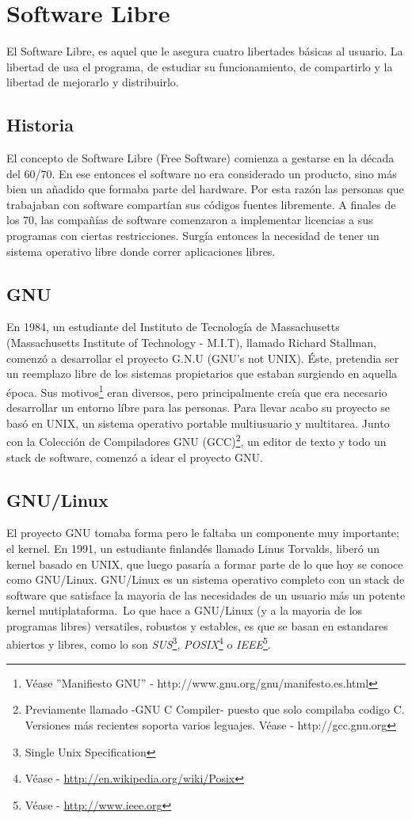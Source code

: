 \section{Software Libre}

El Software Libre, es aquel que le asegura cuatro libertades b\'asicas al
usuario. La libertad de usa el programa, de estudiar su funcionamiento, de
compartirlo y la libertad de mejorarlo y distribuirlo.

\subsection{Historia}
El concepto de Software Libre (Free Software) comienza a gestarse en la 
d\'ecada del 60/70. En ese entonces el software no era considerado un
producto, sino m\'as bien un a\~nadido que formaba parte del hardware. Por esta
raz\'on las personas que trabajaban con software compart\'ian sus c\'odigos
fuentes libremente. A finales de los 70, las compa\~n\'ias de software
comenzaron a implementar licencias a sus programas con ciertas restricciones. 
Surg\'ia entonces la necesidad de tener un sistema operativo libre donde
correr aplicaciones libres.


\subsection{GNU}
En 1984, un estudiante del Instituto de Tecnolog\'ia de Massachusetts
(Massachusetts Institute of Technology - M.I.T), llamado Richard Stallman, 
comenz\'o a desarrollar el proyecto G.N.U (GNU's not UNIX).
\'Este, pretendia ser un reemplazo libre de los sistemas propietarios que 
estaban surgiendo en aquella \'epoca.
Sus motivos\footnote{V\'ease ''Manifiesto GNU'' - 
http://www.gnu.org/gnu/manifesto.es.html} eran diversos, pero principalmente 
cre\'ia que era necesario desarrollar un entorno l\'ibre para las personas.
Para llevar acabo su proyecto se bas\'o en UNIX, un sistema operativo 
portable multiusuario y multitarea. Junto con la Colecci\'on de Compiladores
GNU (GCC)\footnote{Previamente llamado -GNU C Compiler- puesto que solo
compilaba codigo C. Versiones m\'as recientes soporta varios leguajes. V\'ease
- http://gcc.gnu.org}, un editor de texto y todo un stack de software,
comenz\'o a idear el proyecto GNU.

\subsection{GNU/Linux}
El proyecto GNU tomaba forma pero le faltaba un componente muy importante; el
kernel. 
En 1991, un estudiante finland\'es llamado Linus Torvalds, liber\'o un kernel
basado en UNIX, que luego pasar\'ia a formar parte de lo que hoy se conoce como
GNU/Linux.
GNU/Linux es un sistema operativo completo con un stack de software que
satisface la mayoria de las necesidades de un usuario m\'as un potente kernel
mutiplataforma.\
Lo que hace a GNU/Linux (y a la mayoria de los programas libres) versatiles,
robustos y estables, es que se basan en estandares abiertos y libres, como lo
son \emph{SUS}\footnote{Single Unix Specification},
\emph{POSIX}\footnote{V\'ease - \url{http://en.wikipedia.org/wiki/Posix}} o
\emph{IEEE}\footnote{V\'ease - \url{http://www.ieee.org}}.


